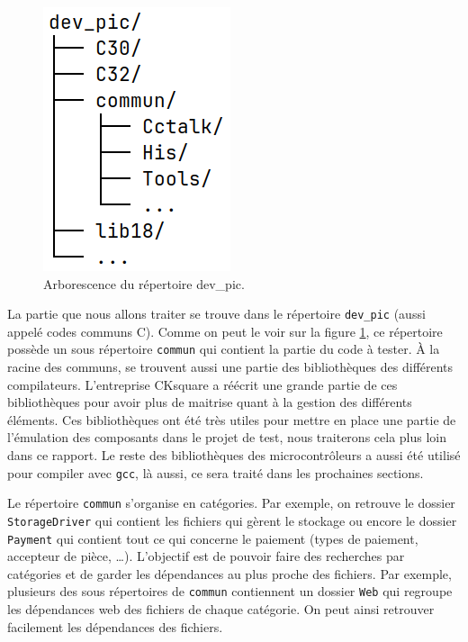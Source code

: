 \documentclass[a4paper]{article}
\begin{document}
\begin{figure}[h!]
  \begin{center}
    \includegraphics[scale=0.5]{./img/arborescence-devpic.png}
    \caption{Arborescence du répertoire dev\_pic.}
    \label{fig:repdevpic}
  \end{center}
\end{figure}

La partie que nous allons traiter se trouve dans le répertoire \verb|dev_pic|
(aussi appelé codes communs C). Comme on peut le voir sur la figure
\ref{fig:repdevpic}, ce répertoire possède un sous répertoire \verb|commun| qui
contient la partie du code à tester. À la racine des communs, se trouvent aussi
une partie des bibliothèques des différents compilateurs. L'entreprise CKsquare
a réécrit une grande partie de ces bibliothèques pour avoir plus de maitrise
quant à la gestion des différents éléments. Ces bibliothèques ont été très
utiles pour mettre en place une partie de l'émulation des composants dans le
projet de test, nous traiterons cela plus loin dans ce rapport. Le reste des
bibliothèques des microcontrôleurs a aussi été utilisé pour compiler avec
\verb|gcc|, là aussi, ce sera traité dans les prochaines sections.

Le répertoire \verb|commun| s'organise en catégories. Par exemple, on retrouve
le dossier \verb|StorageDriver| qui contient les fichiers qui gèrent le stockage
ou encore le dossier \verb|Payment| qui contient tout ce qui concerne le
paiement (types de paiement, accepteur de pièce, \dots). L'objectif est de
pouvoir faire des recherches par catégories et de garder les dépendances au plus
proche des fichiers. Par exemple, plusieurs des sous répertoires de
\verb|commun| contiennent un dossier \verb|Web| qui regroupe les dépendances web
des fichiers de chaque catégorie. On peut ainsi retrouver facilement les
dépendances des fichiers.
\end{document}
